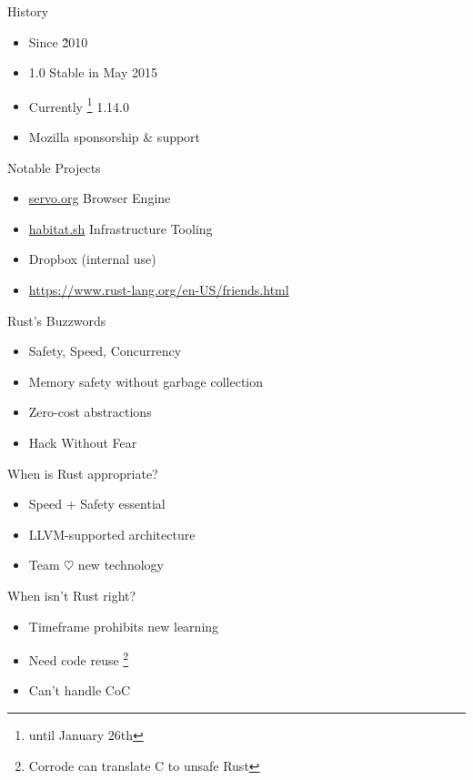 \documentclass[50pt]{beamer}
\begin{document}
    \begin{frame}
        History
        \begin{itemize}
            \item Since \~2010
            \item 1.0 Stable in May 2015
            \item Currently \footnote{until January 26th} 1.14.0
            \item Mozilla sponsorship \& support
        \end{itemize}
    \end{frame}

    \begin{frame}
        Notable Projects
        \begin{itemize}
            \item \url{servo.org} Browser Engine
            \item \url{habitat.sh} Infrastructure Tooling
            \item Dropbox (internal use)
            \item \url{https://www.rust-lang.org/en-US/friends.html}
        \end{itemize}
    \end{frame}

    \begin{frame}
        Rust's Buzzwords
        \begin{itemize}
            \item Safety, Speed, Concurrency
            \item Memory safety without garbage collection
            \item Zero-cost abstractions
            \item Hack Without Fear
        \end{itemize}
    \end{frame}

    \begin{frame}
        When is Rust appropriate?
        \begin{itemize}
            \item Speed + Safety essential
            \item LLVM-supported architecture
            \item Team $\heartsuit$ new technology
        \end{itemize}
    \end{frame}

    \begin{frame}
        When isn't Rust right?
        \begin{itemize}
            \item Timeframe prohibits new learning
            \item Need code reuse \footnote{Corrode can translate C to unsafe Rust}
            \item Can't handle CoC
        \end{itemize}
    \end{frame}
\end{document}
